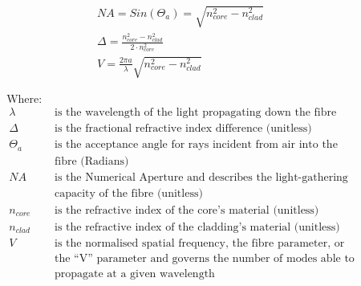 \documentclass[colorlinks,11pt,a4paper,normalphoto,withhyper,ragged2e]{altareport}
\begin{document}
\begin{paracol}{2}
\medskip

\setlength{\jot}{4ex}
\begin{gather}
	NA = Sin(\Theta_a) = \sqrt{n_{core}^2 - n_{clad}^2} 
	\label{eqn:num_aper}\\
	\Delta = \frac{n_{core}^2 - n_{clad}^2}{2 \cdot n_{core}^2}
	\label{eqn:frac_ri_diff}\\
	V = \frac{2 \pi a}{\lambda}\sqrt{n_{core}^2 - n_{clad}^2} 
	\label{eqn:normalised}
\end{gather}

\switchcolumn

\setlength{\jot}{1ex}
\begin{align}
	\text{Where:}& \nonumber\\\
	\lambda & \text{ is the wavelength of the light propagating down the fibre} \nonumber\\\
	\Delta & \text{ is the fractional refractive index difference (unitless)} \nonumber\\\
	\Theta_a & \text{ is the acceptance angle for rays incident from air into the}\nonumber\\\
	& \text{ fibre (Radians)} \nonumber\\\
	NA & \text{ is the Numerical Aperture and describes the light-gathering} \nonumber\\\
	& \text{ capacity of the fibre (unitless)} \nonumber\\\
	n_{core} & \text{ is the refractive index of the core's material (unitless)} \nonumber\\\
	n_{clad} & \text{ is the refractive index of the cladding's material (unitless)} \nonumber\\\
	V & \text{ is the normalised spatial frequency, the fibre parameter, or} \nonumber\\\
	& \text{ the ``V'' parameter and governs the number of modes able to} \nonumber\\
	& \text{ propagate at a given wavelength} \nonumber
\end{align}
\end{paracol}
\end{document}
